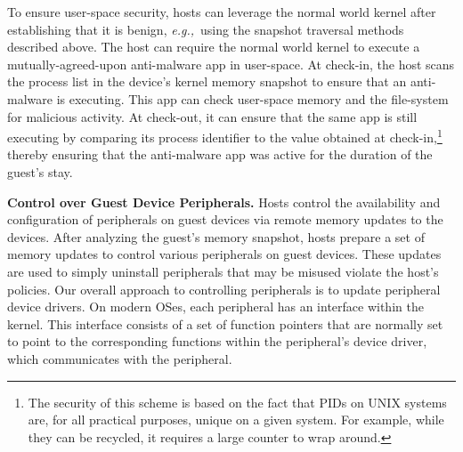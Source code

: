 \documentclass[pageno]{sig-alternate-05-2015}
\newcommand{\myparagraph}[1]{\indent\par\noindent\textsf{\textbf{#1.}}}
\newcommand{\eg}{\textit{e.g.,}}
\begin{document}
To ensure user-space security, hosts can leverage the normal world kernel after
establishing that it is benign, \eg~using the snapshot traversal methods
described above. The host can require the normal world kernel to execute a
mutually-agreed-upon anti-malware app in user-space. At check-in, the host
scans the process list in the device's kernel memory snapshot to ensure that an
anti-malware is executing. This app can check user-space memory and the
file-system for malicious activity. At check-out, it can ensure that the same
app is still executing by comparing its process identifier to the value
obtained at check-in,\footnote{The security of this scheme is based on the fact
that PIDs on UNIX systems are, for all practical purposes, unique on a given
system. For example, while they can be recycled, it requires a large counter to
wrap around.} thereby ensuring that the anti-malware app was active for the
duration of the guest's stay.

\myparagraph{Control over Guest Device Peripherals}
%
Hosts control the availability and configuration of peripherals on guest
devices via remote memory updates to the devices. After analyzing the guest's
memory snapshot, hosts prepare a set of memory updates to control various
peripherals on guest devices. These updates are used to simply uninstall
peripherals that may be misused violate the host's policies. Our overall
approach to controlling peripherals is to update peripheral device drivers. On
modern OSes, each peripheral has an interface within the kernel. This interface
consists of a set of function pointers that are normally set to point to the
corresponding functions within the peripheral's device driver, which
communicates with the peripheral. 
\end{document}
